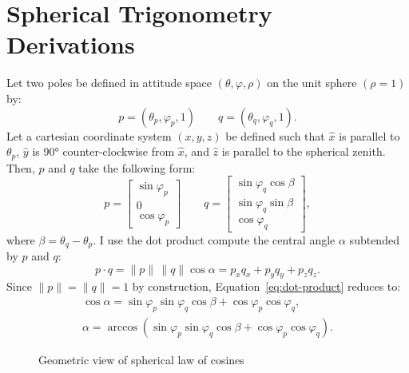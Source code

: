 \chapter{Spherical Trigonometry Derivations}\label{app:spherical-trig}
Let two poles be defined in attitude space $(\theta,\varphi,\rho)$ on the unit sphere $(\rho=1)$ by:
\begin{equation}
    p=(\theta_p,\varphi_p,1)\qquad q=(\theta_q,\varphi_q,1).
\end{equation}
Let a cartesian coordinate system $(x,y,z)$ be defined such that $\hat x$ is parallel to $\theta_p$, $\hat y$ is \ang{90} counter-clockwise from $\hat x$, and $\hat z$ is parallel to the spherical zenith. Then, $p$ and $q$ take the following form: %
\begin{equation}
    p=
    \begin{bmatrix}
        \sin\varphi_p\\
        0\\
        \cos\varphi_p
    \end{bmatrix}
    \qquad
    q=
    \begin{bmatrix}
        \sin\varphi_q\cos\beta\\
        \sin\varphi_q\sin\beta\\
        \cos\varphi_q
    \end{bmatrix},
\end{equation}
where $\beta=\theta_q-\theta_p$. I use the dot product compute the central angle $\alpha$ subtended by $p$ and $q$:
\begin{equation}
    p\cdot q
    =\|p\|\,\|q\|\cos\alpha
    =p_{x}q_{x}
    +p_{y}q_{y}
    +p_{z}q_{z}.\label{eq:dot-product}
\end{equation}
Since $\|p\|=\|q\|=1$ by construction, Equation~\eqref{eq:dot-product} reduces to:
\begin{gather}
    \cos\alpha
    =\sin\varphi_p\sin\varphi_q\cos\beta
    +\cos\varphi_p\cos\varphi_q,\nonumber\\
    \alpha
    =\arccos(\sin\varphi_p\sin\varphi_q\cos\beta
    +\cos\varphi_p\cos\varphi_q).
\end{gather}

\begin{figure}
    \begin{center}
        \caption[Spherical law of cosines]{Geometric view of spherical law of cosines}%
        \label{fig:spherical-cosines}%
    \end{center}
\end{figure}

